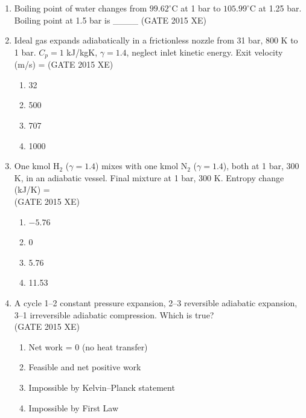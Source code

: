 \documentclass[journal,12pt,onecolumn]{IEEEtran}
\begin{document}
\begin{enumerate}
\item Boiling point of water changes from $99.62^\circ$C at 1 bar to $105.99^\circ$C at 1.25 bar. Boiling point at 1.5 bar is \_\_\_\_
\hfill{(GATE 2015 XE)} \\


\item Ideal gas expands adiabatically in a frictionless nozzle from 31 bar, 800 K to 1 bar. $C_p=1$ kJ/kgK, $\gamma=1.4$, neglect inlet kinetic energy. Exit velocity (m/s) =  
\hfill{(GATE 2015 XE)} \\
\begin{multicols}{4}
\begin{enumerate}
\item 32
\item 500
\item 707
\item 1000
\end{enumerate}
\end{multicols}

\item One kmol H$_2$ ($\gamma=1.4$) mixes with one kmol N$_2$ ($\gamma=1.4$), both at 1 bar, 300 K, in an adiabatic vessel. Final mixture at 1 bar, 300 K. Entropy change (kJ/K) =  \\
\hfill{(GATE 2015 XE)} 
\begin{multicols}{4}
\begin{enumerate}
\item $-5.76$
\item 0
\item 5.76
\item 11.53
\end{enumerate}
\end{multicols}

\newpage 

\item A cycle 1–2 constant pressure expansion, 2–3 reversible adiabatic expansion, 3–1 irreversible adiabatic compression. Which is true?  \\
\hfill{(GATE 2015 XE)} 
\begin{multicols}{2}
\begin{enumerate}
\item Net work = 0 (no heat transfer)
\item Feasible and net positive work
\item Impossible by Kelvin–Planck statement
\item Impossible by First Law
\end{enumerate}
\end{multicols}



\end{enumerate}
\end{document}
